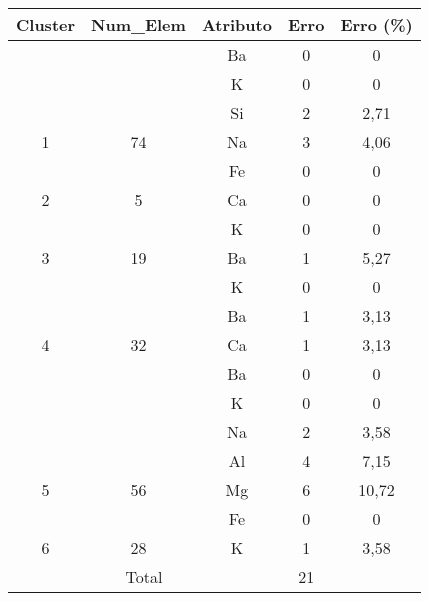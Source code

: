 \begin{apendicesenv}
\begin{table}[]
{{\begin{tabular}{|c|c|c|c|c|}
\hline
\rowcolor[HTML]{EFEFEF} 
\hline
Cluster             & Num\_Elem              & Atributo     & Erro & Erro (\%) \\ \hline
 &  & Ba & 0 & 0\\
 &  & K & 0 & 0\\
 &  & Si & 2 & 2,71\\
\multirow{-2}{*}{1} &   \multirow{-2}{*}{74}& Na & 3 & 4,06\\ \hline
  &  & Fe & 0 & 0\\
 \multirow{-2}{*}{2} &   \multirow{-2}{*}{5} & Ca & 0 & 0\\ \hline
  &  & K & 0 & 0\\
 \multirow{-2}{*}{3} &   \multirow{-2}{*}{19} & Ba & 1 & 5,27 \\ \hline
  &   & K & 0 & 0\\
 &  &  Ba & 1 & 3,13\\
\multirow{-3}{*}{4} &   \multirow{-3}{*}{32} & Ca & 1 & 3,13\\ \hline
 &  & Ba & 0 & 0\\
 &  & K & 0 & 0\\
 &  &  Na & 2 & 3,58\\
 &  & Al & 4 & 7,15\\
\multirow{-5}{*}{5} &   \multirow{-5}{*}{56}  & Mg & 6 & 10,72\\ \hline
  &  & Fe & 0 & 0\\
 \multirow{-2}{*}{6} &   \multirow{-2}{*}{28} & K & 1 & 3,58 \\ \hline
\multicolumn{3}{|c|}{Total}                             & 21   &\\ \hline
\end{tabular}
} %
} %
\end{table}



\end{apendicesenv}
